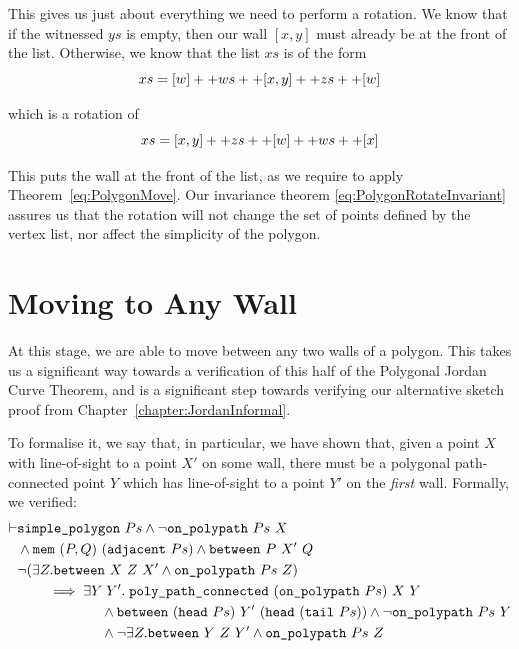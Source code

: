 This gives us just about everything we need to perform a rotation. We know that if the witnessed $ys$ is empty, then our wall $[x,y]$ must already be at the front of the list. Otherwise, we know that the list $xs$ is of the form
\begin{displaymath}
  xs = [w] ++ ws ++ [x,y] ++ zs ++ [w]
\end{displaymath}

which is a rotation of
\begin{displaymath}
  xs = [x,y] ++ zs ++ [w] ++ ws ++ [x]
\end{displaymath}

This puts the wall at the front of the list, as we require to apply Theorem~\ref{eq:PolygonMove}. Our invariance theorem \eqref{eq:PolygonRotateInvariant} assures us that the rotation will not change the set of points defined by the vertex list, nor affect the simplicity of the polygon.

\section{Moving to Any Wall}
At this stage, we are able to move between any two walls of a polygon. This takes us a significant way towards a verification of this half of the Polygonal Jordan Curve Theorem, and is a significant step towards verifying our alternative sketch proof from Chapter~\ref{chapter:JordanInformal}. 

To formalise it, we say that, in particular, we have shown that, given a point $X$ with line-of-sight to a point $X'$ on some wall, there must be a polygonal path-connected point $Y$ which has line-of-sight to a point $Y'$ on the \emph{first} wall. Formally, we verified:
\begin{equation}
  \begin{split}
\vdash    &\texttt{simple\_polygon}\ Ps \wedge \neg\texttt{on\_polypath}\ Ps\ X\\
    &\wedge \texttt{mem}\ (P,Q)\ (\texttt{adjacent}\ Ps) \wedge \texttt{between}\ P\ X'\ Q\\
    &\neg(\exists Z. \texttt{between}\ X\ Z\ X' \wedge \texttt{on\_polypath}\ Ps\ Z)\\
    &\qquad\implies \exists Y\; Y'.\; \texttt{poly\_path\_connected}\ (\texttt{on\_polypath}\ Ps)\ X\ Y\\
    &\qquad\qquad\qquad\wedge \texttt{between}\ (\texttt{head}\ Ps)\ Y'\ (\texttt{head}\ (\texttt{tail}\ Ps))\wedge\neg\texttt{on\_polypath}\ Ps\ Y\\
    &\qquad\qquad\qquad\wedge \neg\exists Z. \texttt{between}\ Y\ Z\ Y' \wedge \texttt{on\_polypath}\ Ps\ Z
  \end{split}
\end{equation}

